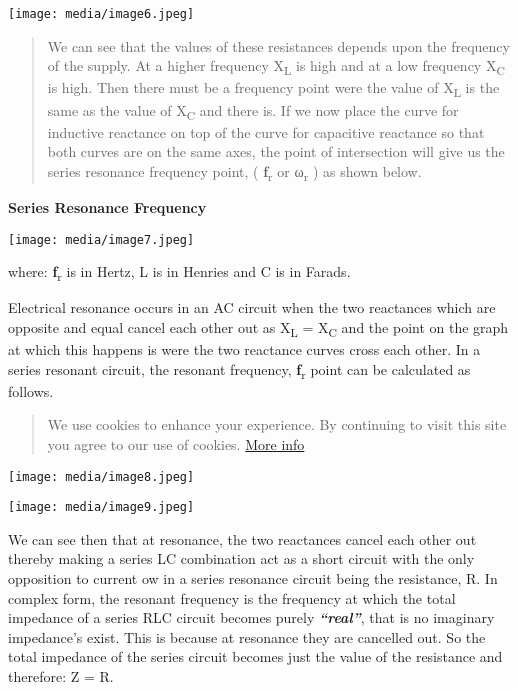 \documentclass[]{article}
\begin{document}
\texttt{[image: media/image6.jpeg]}

\begin{quote}
We can see that the values of these resistances depends upon the
frequency of the supply. At a higher frequency X\textsubscript{L} is
high and at a low frequency X\textsubscript{C} is high. Then there must
be a frequency point were the value of X\textsubscript{L} is the same as
the value of X\textsubscript{C} and there is. If we now place the curve
for inductive reactance on top of the curve for capacitive reactance so
that both curves are on the same axes, the point of intersection will
give us the series resonance frequency point, (
\textbf{ƒ}\textsubscript{r} or ω\textsubscript{r} ) as shown below.
\end{quote}

\textbf{Series Resonance Frequency}

\texttt{[image: media/image7.jpeg]}

where: \textbf{f}\textsubscript{r} is in Hertz, L is in Henries and C is
in Farads.

Electrical resonance occurs in an AC circuit when the two reactances
which are opposite and equal cancel each other out as X\textsubscript{L}
= X\textsubscript{C} and the point on the graph at which this happens is
were the two reactance curves cross each other. In a series resonant
circuit, the resonant frequency, \textbf{ƒ}\textsubscript{r} point can
be calculated as follows.

\begin{quote}
We use cookies to enhance your experience. By continuing to visit this
site you agree to our use of cookies.
\href{http://wikipedia.org/wiki/HTTP_cookie}{More info}
\end{quote}

\texttt{[image: media/image8.jpeg]}

\texttt{[image: media/image9.jpeg]}

We can see then that at resonance, the two reactances cancel each other
out thereby making a series LC combination act as a short circuit with
the only opposition to current ow in a series resonance circuit being
the resistance, R. In complex form, the resonant frequency is the
frequency at which the total impedance of a series RLC circuit becomes
purely \emph{\textbf{``real''}}, that is no imaginary impedance's exist.
This is because at resonance they are cancelled out. So the total
impedance of the series circuit becomes just the value of the resistance
and therefore: Z = R.
\end{document}
